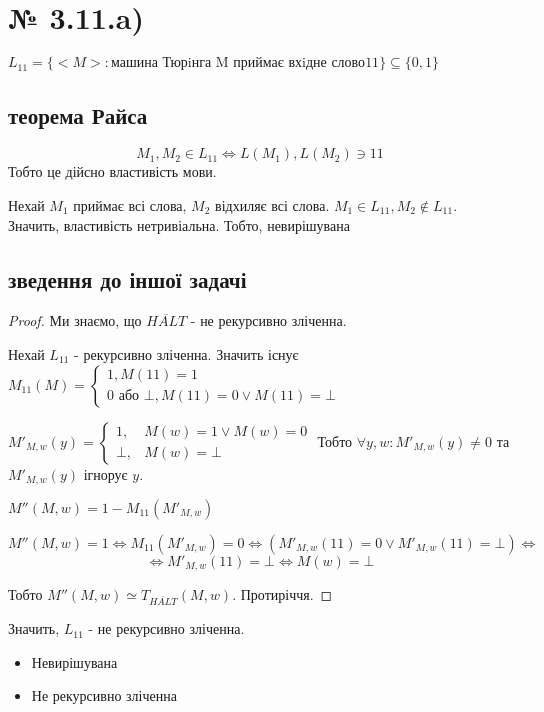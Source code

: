 \documentclass[11pt, a4paper]{article} %
\begin{document}
\section*{№ 3.11.a)}
\begin{mdframed}
    $L_{11} = \{<M> : \text{машина Тюрiнга M приймає вхiдне слово} 11\} \subseteq \{0, 1\}$
\end{mdframed}

\subsection*{теорема Райса}
$$M_1, M_2 \in L_{11} \iff L(M_1), L(M_2) \ni 11$$
Тобто це дійсно властивість мови. 

Нехай $M_1$ приймає всі слова, $M_2$ відхиляє всі слова. $M_1 \in L_{11}, M_2 \notin L_{11}$. 
Значить, властивість нетривіальна. Тобто, невирішувана


\subsection*{зведення до іншої задачі}

\begin{proof}
    Ми знаємо, що $\overline{HALT}$ - не рекурсивно зліченна. 

    Нехай $L_{11}$ - рекурсивно зліченна. Значить існує $M_{11}(M) = \begin{cases}
        1, M(11) = 1\\
        0 \text{ або } \bot, M(11) = 0 \vee M(11) = \bot
    \end{cases}$

    $M'_{M,w}(y) = \begin{cases}
        1,& M(w) = 1 \vee M(w) = 0\\
        \bot, & M(w) = \bot
    \end{cases}$
    Тобто $\forall y,w: M'_{M,w}(y) \ne 0$ та $M'_{M,w}(y)$ ігнорує $y$.

    $M''(M,w) = 1 - M_{11}(M'_{M,w})$

    $$M''(M,w) = 1 \iff M_{11}(M'_{M,w}) = 0 \iff \left(M'_{M,w}(11) = 0 \vee M'_{M,w}(11) = \bot \right) \iff$$
    $$\iff M'_{M,w}(11) = \bot \iff M(w) = \bot$$

    Тобто $M''(M,w) \simeq T_{\overline{HALT}}(M,w)$.
    Протиріччя.
\end{proof}
Значить, $L_{11}$ - не рекурсивно зліченна.


\begin{mdframed}[backgroundcolor=red!20]
    \begin{itemize}
        \item Невирішувана
        \item Не рекурсивно зліченна
    \end{itemize}
\end{mdframed}
\end{document}
